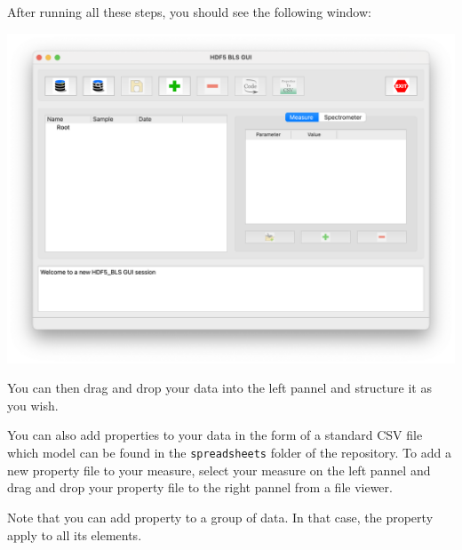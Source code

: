 After running all these steps, you should see the following window:

\begin{center}
    \includegraphics[width=\textwidth]{img/main_window.png}
\end{center}

You can then drag and drop your data into the left pannel and structure it as you wish. 

You can also add properties to your data in the form of a standard CSV file which model can be found in the \texttt{spreadsheets} folder of the repository. To add a new property file to your measure, select your measure on the left pannel and drag and drop your property file to the right pannel from a file viewer. 

Note that you can add property to a group of data. In that case, the property apply to all its elements.